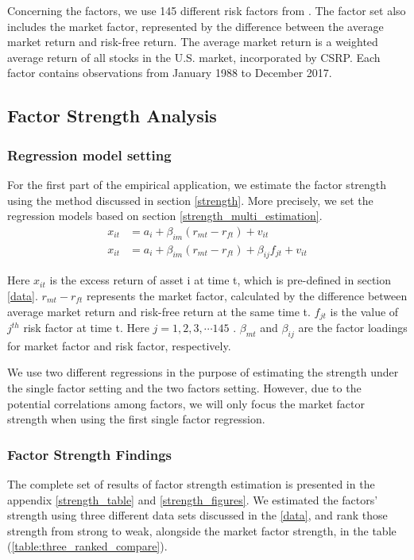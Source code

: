 Concerning the factors, we use 145 different risk factors from .
The factor set also includes the market factor, represented by the difference between the average market return and risk-free return.
The average market return is a weighted average return of all stocks in the U.S. market, incorporated by CSRP.
Each factor contains observations from January 1988 to December 2017.

\subsection{Factor Strength Analysis}

\subsubsection{Regression model setting}
For the first part of the empirical application, we estimate the factor strength using the method discussed in section \ref{strength}.
More precisely, we set the regression models based on section \ref{strength_multi_estimation}.
\begin{align*}
  x_{it} &= a_i + \beta_{im}(r_{mt} - r_{ft}) + v_{it} \\
 x_{it} &= a_i + \beta_{im}(r_{mt} - r_{ft}) + \beta_{ij}f_{jt} + v_{it} 
\end{align*}

Here $x_{it}$ is the excess return of asset i at time t, which is pre-defined in section \ref{data}.
$r_{mt} - r_{ft}$ represents the market factor, calculated by the difference between average market return and risk-free return at the same time t.
$f_{jt}$ is the value of $j^{th}$ risk factor  at time t. 
Here $j = 1, 2, 3,\cdots 145$ . 
$\beta_{mt}$ and $\beta_{ij}$ are the factor loadings for market factor and risk factor, respectively.

We use two different regressions in the purpose of estimating the strength under the single factor setting and the two factors setting.
However, due to the potential correlations among factors, we will only focus the market factor strength when using the first single factor regression.


	\subsubsection{Factor Strength Findings}
The complete set of results of factor strength estimation is presented in the appendix \ref{strength_table} and \ref{strength_figures}.
We estimated the factors' strength using three different data sets discussed in the \ref{data}, and rank those strength from strong to weak, alongside the market factor strength, in the table (\ref{table:three_ranked_compare}).

